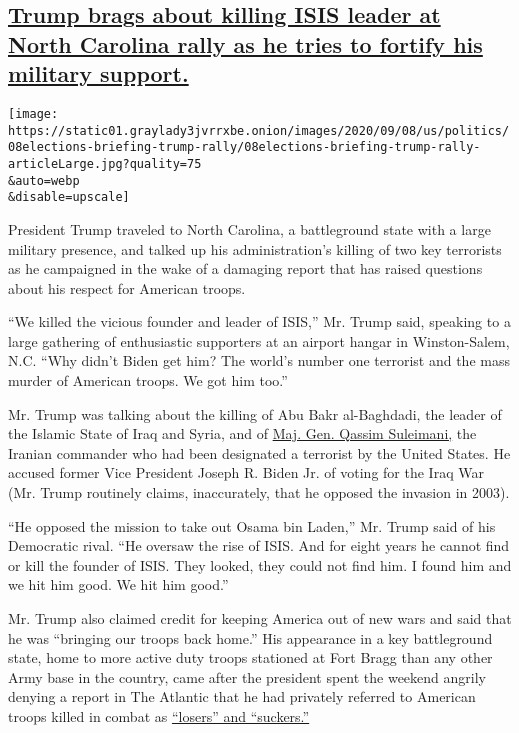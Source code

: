 \hypertarget{trump-brags-about-killing-isis-leader-at-north-carolina-rally-as-he-tries-to-fortify-his-military-support}{%
\subsection{\texorpdfstring{\protect\hyperlink{trump-brags-about-killing-isis-leader-at-north-carolina-rally-as-he-tries-to-fortify-his-military-support}{Trump
brags about killing ISIS leader at North Carolina rally as he tries to
fortify his military
support.}}{Trump brags about killing ISIS leader at North Carolina rally as he tries to fortify his military support.}}\label{trump-brags-about-killing-isis-leader-at-north-carolina-rally-as-he-tries-to-fortify-his-military-support}}

\texttt{[image: https://static01.graylady3jvrrxbe.onion/images/2020/09/08/us/politics/08elections-briefing-trump-rally/08elections-briefing-trump-rally-articleLarge.jpg?quality=75\\\&auto=webp\\\&disable=upscale]}

President Trump traveled to North Carolina, a battleground state with a
large military presence, and talked up his administration's killing of
two key terrorists as he campaigned in the wake of a damaging report
that has raised questions about his respect for American troops.

``We killed the vicious founder and leader of ISIS,'' Mr. Trump said,
speaking to a large gathering of enthusiastic supporters at an airport
hangar in Winston-Salem, N.C. ``Why didn't Biden get him? The world's
number one terrorist and the mass murder of American troops. We got him
too.''

Mr. Trump was talking about the killing of Abu Bakr al-Baghdadi, the
leader of the Islamic State of Iraq and Syria, and of
\href{https://www.nytimes3xbfgragh.onion/2020/01/03/world/middleeast/suleimani-dead.html}{Maj.
Gen. Qassim Suleimani,} the Iranian commander who had been designated a
terrorist by the United States. He accused former Vice President Joseph
R. Biden Jr. of voting for the Iraq War (Mr. Trump routinely claims,
inaccurately, that he opposed the invasion in 2003).

``He opposed the mission to take out Osama bin Laden,'' Mr. Trump said
of his Democratic rival. ``He oversaw the rise of ISIS. And for eight
years he cannot find or kill the founder of ISIS. They looked, they
could not find him. I found him and we hit him good. We hit him good.''

Mr. Trump also claimed credit for keeping America out of new wars and
said that he was ``bringing our troops back home.'' His appearance in a
key battleground state, home to more active duty troops stationed at
Fort Bragg than any other Army base in the country, came after the
president spent the weekend angrily denying a report in The Atlantic
that he had privately referred to American troops killed in combat as
\href{https://www.nytimes3xbfgragh.onion/2020/09/04/us/politics/trump-veterans-losers.html}{``losers''
and ``suckers.''}

